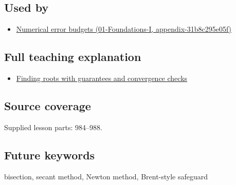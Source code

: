 \subsection{Used by}\label{appendix-f63eb850796d-used-by}

\begin{itemize}
\tightlist
\item
  \href{../01-Foundations-I/main.pdf\#nameddest=appendix-31b8c295e05f}{Numerical error budgets (01-Foundations-I, appendix-31b8c295e05f)}
\end{itemize}

\subsection{Full teaching explanation}\label{appendix-f63eb850796d-full-teaching-explanation}

\begin{itemize}
\tightlist
\item
  \hyperref[02-foundations-ii-ch028-finding-roots-with-guarantees-and-convergence-checks]{Finding roots with guarantees and convergence checks}
\end{itemize}

\subsection{Source coverage}\label{appendix-f63eb850796d-source-coverage}

Supplied lesson parts: 984--988.

\subsection{Future keywords}\label{appendix-f63eb850796d-future-keywords}

bisection, secant method, Newton method, Brent-style safeguard
